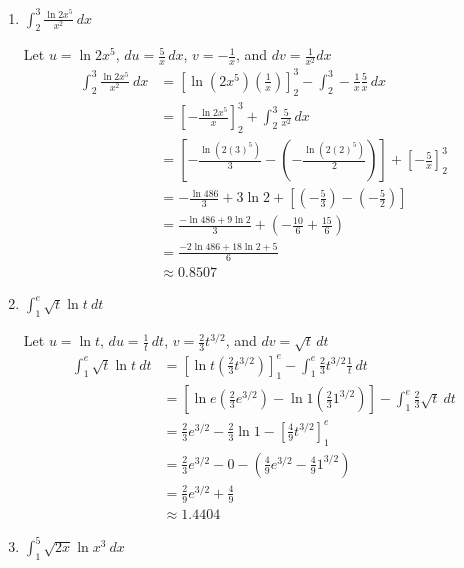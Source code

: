 \documentclass[12pt]{article}
\begin{document}
\begin{enumerate}
\item $\displaystyle\int_2^3 \frac{\ln 2x^5}{x^2} \ dx$

Let $u=\ln 2x^5$, $\displaystyle du=\frac{5}{x}\,dx$, $v=\displaystyle-\frac{1}{x}$, and $dv =\displaystyle\frac{1}{x^2}dx$
\begin{equation*}
\begin{aligned}
\int_2^3 \frac{\ln 2x^5}{x^2} \ dx &= \left[\ln (2x^5)\left( \frac{1}{x}\right)\right]_2^3 - \int_2^3 -\frac{1}{x}\frac{5}{x}\,dx \\
&= \left[-\frac{\ln 2x^5}{x}\right]_2^3 + \int_2^3 \frac{5}{x^2}\,dx \\
&= \left[-\frac{\ln(2(3)^5)}{3}-\left(-\frac{\ln(2(2)^5)}{2}\right)\right]+\left[-\frac{5}{x}\right]_2^3 \\
&= -\frac{\ln 486}{3}+3\ln 2+\left[\left(-\frac{5}{3}\right)-\left(-\frac{5}{2}\right)\right] \\
&= \frac{-\ln 486 + 9\ln 2}{3}+\left(-\frac{10}{6}+\frac{15}{6}\right)\\
&= \frac{-2\ln 486 + 18\ln 2+5}{6}\\
&\approx 0.8507
\end{aligned}
\end{equation*}

\item $\displaystyle\int_1^e \sqrt{t} \ln t \ dt$

Let $u=\ln t$, $\displaystyle du=\frac{1}{t}\,dt$, $v=\displaystyle\frac{2}{3}t^{3/2}$, and $dv =\sqrt{t}\,dt$
\begin{equation*}
\begin{aligned}
\int_1^e \sqrt{t} \ln t \ dt &= \left[\ln t\left( \frac{2}{3}t^{3/2}\right)\right]_1^e - \int_1^e \frac{2}{3}t^{3/2}\frac{1}{t}\,dt \\
&=\left[\ln e \left(\frac{2}{3}e^{3/2}\right)-\ln 1 \left(\frac{2}{3}1^{3/2}\right)\right] - \int_1^e \frac{2}{3} \sqrt{t} \ dt \\
&= \frac{2}{3}e^{3/2}-\frac{2}{3}\ln 1 - \left[\frac{4}{9}t^{3/2}\right]_1^e \\
&= \frac{2}{3}e^{3/2}- 0 - \left(\frac{4}{9}e^{3/2}-\frac{4}{9}1^{3/2}\right) \\
&= \frac{2}{9}e^{3/2}+\frac{4}{9} \\
&\approx 1.4404
\end{aligned}
\end{equation*}

\item $\displaystyle\int_1^5 \sqrt{2x} \ln x^3 \ dx$


\end{enumerate}
\end{document}
